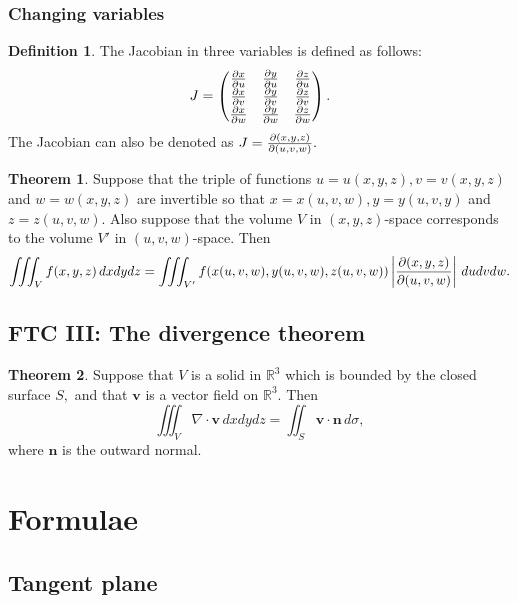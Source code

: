 \documentclass[12pt, a4paper]{article}
\newcommand{\bb}[1]{\mathbb{#1}}
\newcommand{\mb}[1]{\mathbf{#1}}
\theoremstyle{definition}
\newtheorem{definition}{Definition}[section]
\newtheorem{theorem}{Theorem}[section]
\theoremstyle{plain}
\begin{document}
\subsubsection{Changing variables}

\begin{definition}
The Jacobian in three variables is defined as follows: $$J=
\begin{pmatrix} 
\pdv{x}{u} & \pdv{y}{u}&\pdv{z}{u} \\
\pdv{x}{v} & \pdv{y}{v}&\pdv{z}{v} \\
\pdv{x}{w} & \pdv{y}{w}&\pdv{z}{w}
 \end{pmatrix}.$$ The Jacobian can also be denoted as $J=\pdv{(x,y,z)}{(u,v,w)}.$
\end{definition}

\begin{theorem}
Suppose that the triple of functions $u = u(x,y,z), v = v(x,y,z)$ and $w = w(x,y,z)$ are invertible so that $x = x(u,v,w), y = y(u,v,y)$ and $z = z(u,v,w).$ Also suppose that the volume $V$ in $(x, y, z)$-space corresponds to the volume $V'$  in $(u, v, w)$-space. Then $$
\iiint_V f(x,y,z) \, dxdydz = \iiint_{V'} f(x(u,v,w),y(u,v,w),z(u,v,w)) \left|\pdv{(x,y,z)}{(u,v,w)}\right| \, dudvdw.$$
\end{theorem}

\subsection{FTC III: The divergence theorem}

\begin{theorem}
Suppose that $V$ is a solid in $\bb{R}^3$ which is bounded by the closed surface $S,$ and that $\mb{v}$ is a vector field on $\bb{R}^3.$ Then $$\iiint_V \nabla \cdot \mb{v} \, dxdydz =\iint_S \mb{v} \cdot \mb{n} \, d\sigma,$$ where $\mb{n}$ is the outward normal.
\end{theorem}






\pagebreak

\section{Formulae}

\subsection{Tangent plane}
\end{document}
